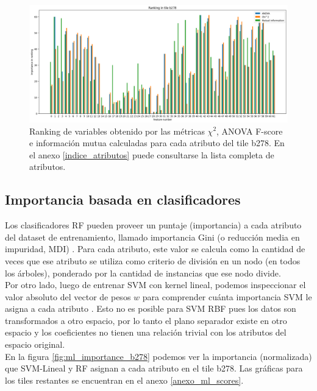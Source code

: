 \begin{figure}[h!]
\centering
  \includegraphics[width=1\textwidth]{Kap6/test=b278_variable_importance_ranking}
\caption{ Ranking de variables obtenido por las métricas $\chi^2$, ANOVA F-score e información mutua calculadas para cada atributo del tile b278. En el anexo \protect\ref{indice_atributos} puede consultarse la lista completa de atributos. }
\label{fig:ranking_b278}
\end{figure}

\subsection{Importancia basada en clasificadores}

Los clasificadores RF pueden proveer un puntaje (importancia) a cada atributo del dataset de entrenamiento, llamado importancia Gini (o reducción media en impuridad, MDI) \cite{statisticallearning}. Para cada atributo, este valor se calcula como la cantidad de veces que ese atributo se utiliza como criterio de división en un nodo (en todos los árboles), ponderado por la cantidad de instancias que ese nodo divide. \\

Por otro lado, luego de entrenar SVM con kernel lineal, podemos inspeccionar el valor absoluto del vector de pesos $w$ para comprender cuánta importancia SVM le asigna a cada atributo \cite{svm_importance}. Esto no es posible para SVM RBF pues los datos son transformados a otro espacio, por lo tanto el plano separador existe en otro espacio y los coeficientes no tienen una relación trivial con los atributos del espacio original. \\

En la figura \ref{fig:ml_importance_b278} podemos ver la importancia (normalizada) que SVM-Lineal y RF asignan a cada atributo en el tile b278. Las gráficas para los tiles restantes se encuentran en el anexo \ref{anexo_ml_scores}. \\


